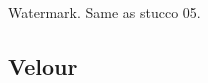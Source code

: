 \documentclass[12pt,a4paper]{article}
\begin{document}
\begin{singlespace}
\renewcommand{\Number}{01}\InputImage{\sfl}{\tsm}{\sro}{\tco}{\sro}{\tco}
{}{}
\renewcommand{\Number}{02}\InputImage{\sro}{\tco}{\sro}{\tco}{\sro}{\tco}
{Watermark.}{}
\renewcommand{\Number}{03}\InputImage{\sfl}{\tco}{\sfl}{\tco}{\sfl}{\tco}
{}{}
\renewcommand{\Number}{04}\InputImage{\sfl}{\tco}{\sfl}{\tco}{\sfl}{\tco}
{}{}
\renewcommand{\Number}{05}\InputImage{\sfl}{\tco}{\sro}{\tco}{\sro}{\tco}
{}{}
\renewcommand{\Number}{06}\InputImage{\sfl}{\tco}{\sro}{\tco}{\sro}{\tco}
{}{}
\renewcommand{\Number}{07}\InputImage{\sfl}{\tco}{\sfl}{\tco}{\sexdi}{\tbu}
{}{}
\renewcommand{\Number}{08}\InputImage{\sfl}{\tco}{\sfl}{\tco}{\sfl}{\tco}
{}{}
\renewcommand{\Number}{09}\InputImage{\sfl}{\tco}{\sfl}{\tco}{\sfl}{\tco}
{}{}
\renewcommand{\Number}{10}\InputImage{\sfl}{\tco}{\sro}{\tco}{\sro}{\tco}
{}{Same as stucco 05.}
\renewcommand{\Number}{11}\InputImage{\sfl}{\tco}{\sro}{\tco}{\sro}{\tco}
{}{}
\renewcommand{\Number}{12}\InputImage{\sfl}{\tco}{\sfl}{\tco}{\sfl}{\tco}
{}{}

\clearpage
\renewcommand{\mat}{Velour}
\subsection{\mat}

\renewcommand{\Number}{01}\InputImage{\sfl}{\tve}{\sfl}{\tve}{\sfl}{\tve}
{}{}
\renewcommand{\Number}{02}\InputImage{\sfl}{\tve}{\sfl}{\tve}{\sexdi}{\tbu}
{}{}
\renewcommand{\Number}{03}\InputImage{\sfl}{\tve}{\sfl}{\tve}{\sexdi}{\tbu}
{}{}
\renewcommand{\Number}{04}\InputImage{\sfl}{\tve}{\sfl}{\tve}{\sexdi}{\tbu}
{}{}
\renewcommand{\Number}{05}\InputImage{\sexdi}{\tco}{\sexdi}{\tco}{\sfl}{\tve}
{}{}
\renewcommand{\Number}{06}\InputImage{\sfl}{\tve}{\sfl}{\tve}{\sexor}{\tbu}
{}{}
\renewcommand{\Number}{07}\InputImage{\sfl}{\tve}{\sfl}{\tve}{\sexdi}{\tbu}
{}{}
\renewcommand{\Number}{08}\InputImage{\sfl}{\tve}{\sfl}{\tve}{\sexdi}{\tbu}
{}{}
\renewcommand{\Number}{09}\InputImage{\sfl}{\tve}{\sfl}{\tve}{\sexdi}{\tbu}
{}{}
\renewcommand{\Number}{10}\InputImage{\sfl}{\tve}{\sfl}{\tve}{\sexdi}{\tbu}
{}{}
\renewcommand{\Number}{11}\InputImage{\sfl}{\tve}{\sfl}{\tve}{\sexor}{\tbu}
{}{}
\renewcommand{\Number}{12}\InputImage{\sfl}{\tve}{\sfl}{\tve}{\sfl}{\tve}
{}{}

\clearpage



\end{singlespace}
\end{document}
